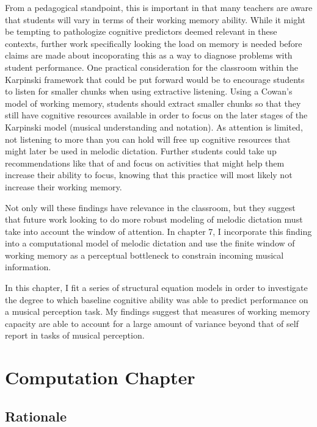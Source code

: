 \documentclass[12pt,]{book}
\begin{document}
From a pedagogical standpoint, this is important in that many teachers are aware that students will vary in terms of their working memory ability.
While it might be tempting to pathologize cognitive predictors deemed relevant in these contexts, further work specifically looking the load on memory is needed before claims are made about incoporating this as a way to diagnose problems with student performance.
One practical consideration for the classroom within the Karpinski framework that could be put forward would be to encourage students to listen for smaller chunks when using extractive listening.
Using a Cowan's model of working memory, students should extract smaller chunks so that they still have cognitive resources available in order to focus on the later stages of the Karpinski model (musical understanding and notation).
As attention is limited, not listening to more than you can hold will free up cognitive resources that might later be used in melodic dictation.
Further students could take up recommendations like that of \citet{chenetteReframingAuralSkills2019} and focus on activities that might help them increase their ability to focus, knowing that this practice will most likely not increase their working memory.

Not only will these findings have relevance in the classroom, but they suggest that future work looking to do more robust modeling of melodic dictation must take into account the window of attention.
In chapter 7, I incorporate this finding into a computational model of melodic dictation and use the finite window of working memory as a perceptual bottleneck to constrain incoming musical information.

In this chapter, I fit a series of structural equation models in order to investigate the degree to which baseline cognitive ability was able to predict performance on a musical perception task.
My findings suggest that measures of working memory capacity are able to account for a large amount of variance beyond that of self report in tasks of musical perception.

\hypertarget{computation-chapter}{%
\chapter{Computation Chapter}\label{computation-chapter}}

\hypertarget{rationale-2}{%
\section{Rationale}\label{rationale-2}}
\end{document}
